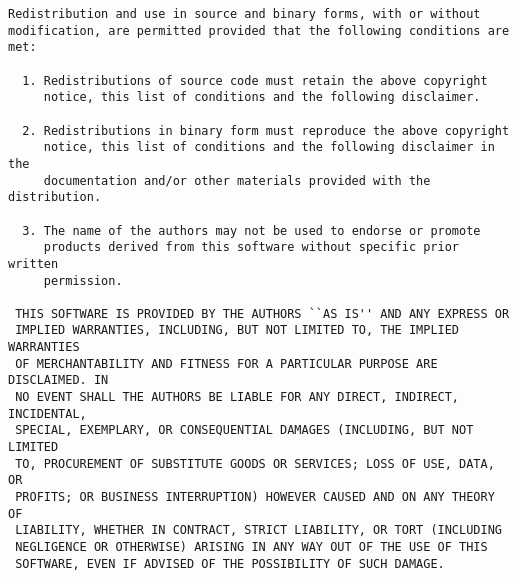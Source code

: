 \documentclass[11pt]{book}
\begin{document}
\begin{verbatim}
Redistribution and use in source and binary forms, with or without
modification, are permitted provided that the following conditions are met:
 
  1. Redistributions of source code must retain the above copyright
     notice, this list of conditions and the following disclaimer.
 
  2. Redistributions in binary form must reproduce the above copyright
     notice, this list of conditions and the following disclaimer in the
     documentation and/or other materials provided with the distribution.
 
  3. The name of the authors may not be used to endorse or promote
     products derived from this software without specific prior written
     permission.
 
 THIS SOFTWARE IS PROVIDED BY THE AUTHORS ``AS IS'' AND ANY EXPRESS OR
 IMPLIED WARRANTIES, INCLUDING, BUT NOT LIMITED TO, THE IMPLIED WARRANTIES
 OF MERCHANTABILITY AND FITNESS FOR A PARTICULAR PURPOSE ARE DISCLAIMED. IN
 NO EVENT SHALL THE AUTHORS BE LIABLE FOR ANY DIRECT, INDIRECT, INCIDENTAL,
 SPECIAL, EXEMPLARY, OR CONSEQUENTIAL DAMAGES (INCLUDING, BUT NOT LIMITED
 TO, PROCUREMENT OF SUBSTITUTE GOODS OR SERVICES; LOSS OF USE, DATA, OR
 PROFITS; OR BUSINESS INTERRUPTION) HOWEVER CAUSED AND ON ANY THEORY OF
 LIABILITY, WHETHER IN CONTRACT, STRICT LIABILITY, OR TORT (INCLUDING
 NEGLIGENCE OR OTHERWISE) ARISING IN ANY WAY OUT OF THE USE OF THIS
 SOFTWARE, EVEN IF ADVISED OF THE POSSIBILITY OF SUCH DAMAGE.
\end{verbatim}
\end{document}
